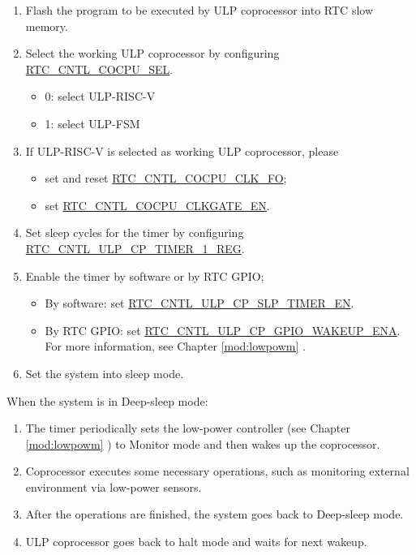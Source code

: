 \documentclass[main\_\_EN.tex]{subfiles}
\begin{document}
\begin{enumerate}
    \item Flash the program to be executed by ULP coprocessor into RTC slow memory.
    \item Select the working ULP coprocessor by configuring \hyperref[fielddesc:RTCCNTLCOCPUSEL]{RTC\_CNTL\_COCPU\_SEL}.
    \begin{itemize}
        \item 0: select ULP-RISC-V
        \item 1: select ULP-FSM
    \end{itemize}
    \item If ULP-RISC-V is selected as working ULP coprocessor, please

    \begin{itemize}
        \item set and reset \hyperref[fielddesc:RTCCNTLCOCPUCLKFO]{RTC\_CNTL\_COCPU\_CLK\_FO};
        \item set \hyperref[fielddesc:RTCCNTLCOCPUCLKGATEEN]{RTC\_CNTL\_COCPU\_CLKGATE\_EN}.
    \end{itemize}
    \item Set sleep cycles for the timer by configuring \hyperref[regdesc:RTCCNTLULPCPTIMER1REG]{RTC\_CNTL\_ULP\_CP\_TIMER\_1\_REG}.
    \item Enable the timer by software or by RTC GPIO;
        \begin{itemize}
            \item By software: set \hyperref[fielddesc:RTCCNTLULPCPSLPTIMEREN]{RTC\_CNTL\_ULP\_CP\_SLP\_TIMER\_EN}.
        \item By RTC GPIO: set \hyperref[fielddesc:RTCCNTLULPCPGPIOWAKEUPENA]{RTC\_CNTL\_ULP\_CP\_GPIO\_WAKEUP\_ENA}. For more information, see Chapter \ref{mod:lowpowm} \textit{}. 
        \end{itemize}
    \item Set the system into sleep mode.
\end{enumerate}

When the system is in Deep-sleep mode:

\begin{enumerate}
   \item The timer periodically sets the low-power controller (see Chapter \ref{mod:lowpowm} \textit{}) to Monitor mode and then wakes up the coprocessor.
   \item Coprocessor executes some necessary operations, such as monitoring external environment via low-power sensors.
   \item After the operations are finished, the system goes back to Deep-sleep mode.
   \item ULP coprocessor goes back to halt mode and waits for next wakeup.
\end{enumerate}
\end{document}
